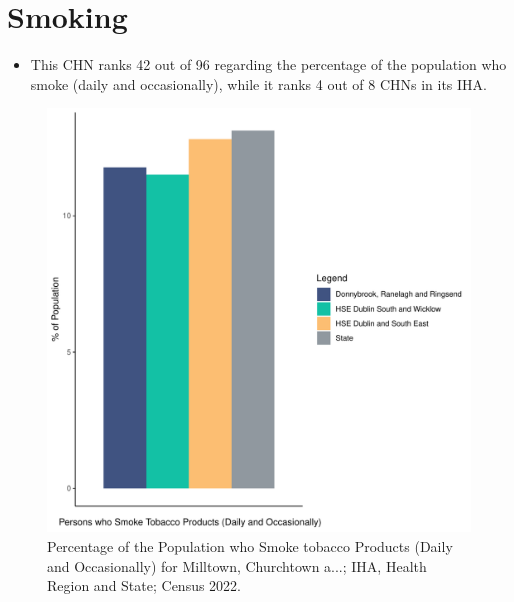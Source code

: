 \documentclass{article}
\begin{document}
\pagebreak

\section{Smoking}\label{sect:Smoking}
\begin{itemize}
\item This CHN ranks  42 out of 96 regarding the percentage of the population who smoke (daily and occasionally), while it ranks   4 out of 8 CHNs in its IHA.
\end{itemize}
\begin{figure}[H]
	\centering
	\includegraphics[width = 120mm]{../figures/SmokingED.pdf}
	\caption{Percentage of the Population who Smoke tobacco Products (Daily and Occasionally) for Milltown, Churchtown a...; IHA, Health Region and State; Census 2022.}
	\label{fig:2ae19629-1a6a-13a3-e055-000000000001}
	\end{figure}
	
\end{document}
